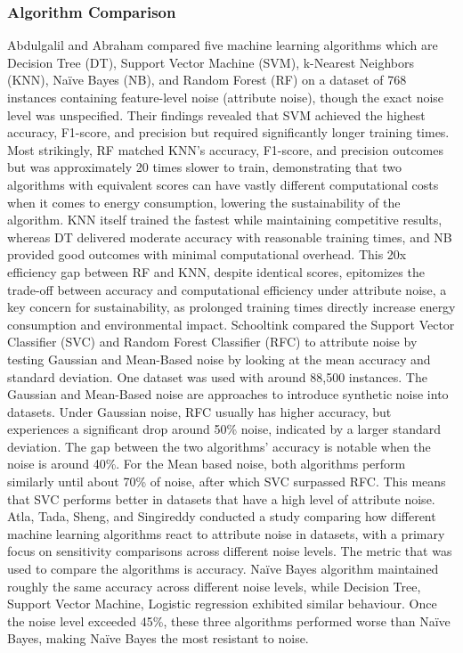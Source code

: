 \documentclass[conference]{IEEEtran}
\begin{document}
\subsubsection*{Algorithm Comparison}
Abdulgalil and Abraham \cite{abduljalil} compared five machine learning algorithms which are Decision Tree (DT), Support Vector Machine (SVM), k-Nearest Neighbors (KNN), Naïve Bayes (NB), and Random Forest (RF) on a dataset of 768 instances containing feature-level noise (attribute noise), though the exact noise level was unspecified. Their findings revealed that SVM achieved the highest accuracy, F1-score, and precision but required significantly longer training times. Most strikingly, RF matched KNN’s accuracy, F1-score, and precision outcomes but was approximately 20 times slower to train, demonstrating that two algorithms with equivalent scores can have vastly different computational costs when it comes to energy consumption, lowering the sustainability of the algorithm. KNN itself trained the fastest while maintaining competitive results, whereas DT delivered moderate accuracy with reasonable training times, and NB provided good outcomes with minimal computational overhead. This 20x efficiency gap between RF and KNN, despite identical scores, epitomizes the trade-off between accuracy and computational efficiency under attribute noise, a key concern for sustainability, as prolonged training times directly increase energy consumption and environmental impact.
\newline
\newline 
Schooltink \cite{schooltink} compared the Support Vector Classifier (SVC) and Random Forest Classifier (RFC) to attribute noise by testing Gaussian and Mean-Based noise by looking at the mean accuracy and standard deviation. One dataset was used with around 88,500 instances. The Gaussian and Mean-Based noise are approaches to introduce synthetic noise into datasets. Under Gaussian noise, RFC usually has higher accuracy, but experiences a significant drop around 50\% noise, indicated by a larger standard deviation. The gap between the two algorithms' accuracy is notable when the noise is around 40\%. For the Mean based noise, both algorithms perform similarly until about 70\% of noise, after which SVC surpassed RFC. This means that SVC performs better in datasets that have a high level of attribute noise. 
\newline
\newline
Atla, Tada, Sheng, and Singireddy \cite{atla2011} conducted a study comparing how different machine learning algorithms react to attribute noise in datasets, with a primary focus on sensitivity comparisons across different noise levels. The metric that was used to compare the algorithms is accuracy. Naïve Bayes algorithm maintained roughly the same accuracy across different noise levels, while Decision Tree, Support Vector Machine, Logistic regression exhibited similar behaviour. Once the noise level exceeded 45\%, these three algorithms performed worse than Naïve Bayes, making Naïve Bayes the most resistant to noise.
\end{document}
